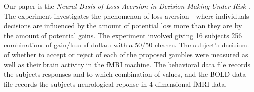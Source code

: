 \par Our paper is the \textit{Neural Basis of Loss Aversion in Decision-Making
Under Risk} \cite{Tom2007LossAversion}. The experiment investigates the 
phenomenon of loss aversion - where individuals decisions are influenced by the
amount of potential loss more than they are by the amount of potential gains. 
The experiment involved giving 16 subjects 256 combinations of gain/loss of 
dollars with a 50/50 chance. The subject's decisions of whether to accept or 
reject of each of the proposed gambles were measured as well as their brain 
activity in the fMRI machine. The behavioral data file records the subjects 
responses and to which combination of values, and the BOLD data file records 
the subjects neurological reponse in 4-dimensional fMRI data. 


